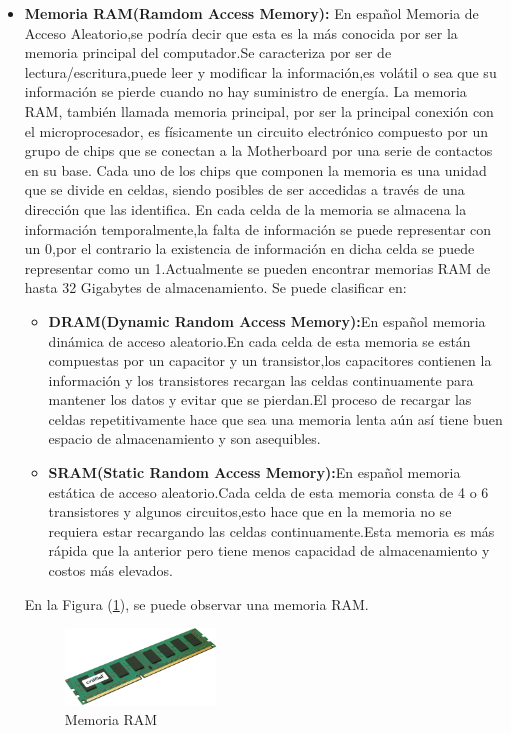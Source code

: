 \documentclass{article}
\begin{document}
\begin{itemize}
    \item \textbf{Memoria RAM(Ramdom Access Memory): }En español Memoria de Acceso Aleatorio,se podría decir que esta es la más conocida por ser la memoria principal del computador.Se caracteriza por ser de lectura/escritura,puede leer y modificar la información,es volátil o sea que su información se pierde cuando no hay suministro de energía.\newline
    La memoria RAM, también llamada memoria principal, por ser la principal conexión con el microprocesador, es físicamente un circuito electrónico compuesto por un grupo de chips que se conectan a la Motherboard por una serie de contactos en su base. Cada uno de los chips que componen la memoria es una unidad que se divide en celdas, siendo posibles de ser accedidas a través de una dirección que las identifica\cite{ram}.\newline
    En cada celda de la memoria se almacena la información temporalmente,la falta de información se puede representar con un 0,por el contrario la existencia de información en dicha celda se puede representar como un 1.Actualmente se pueden encontrar memorias RAM de hasta 32 Gigabytes de almacenamiento.\newline
    Se puede clasificar en:
    \begin{itemize}
    \item\textbf{DRAM(Dynamic Random Access Memory):}En español memoria dinámica de acceso aleatorio.En cada celda de esta memoria se están compuestas por un capacitor y un transistor,los capacitores contienen la información y los transistores recargan las celdas continuamente para mantener los datos y evitar que se pierdan.El proceso de recargar las celdas repetitivamente hace que sea una memoria lenta aún así tiene buen espacio de almacenamiento y son asequibles.
    \item\textbf{SRAM(Static Random Access Memory):}En español memoria estática de acceso aleatorio.Cada celda de esta memoria consta de 4 o 6 transistores y algunos circuitos,esto hace que en la memoria no se requiera estar recargando las celdas continuamente.Esta memoria es más rápida que la anterior pero  tiene menos capacidad de almacenamiento y costos más elevados\cite{ref1}. 
        
    \end{itemize}
    
    En la Figura (\ref{fig:memoria}), se puede observar una memoria RAM.
     \begin{figure}[h]
    \includegraphics[width=4cm]{memoria.png}
    \centering
    \caption{Memoria RAM}
    \label{fig:memoria}
    \end{figure}
    

\end{itemize}
\end{document}
